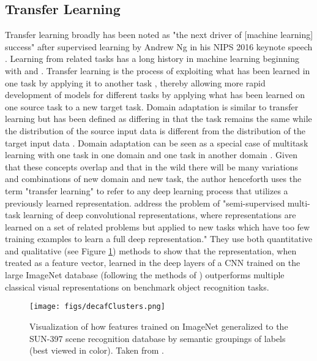 \documentclass[10pt,twocolumn,letterpaper]{article}
\begin{document}
\subsection{Transfer Learning}
Transfer learning broadly has been noted as "the next driver of [machine learning] success" after supervised learning by Andrew Ng in his NIPS 2016 keynote speech \cite{ng2016nips}.
Learning from related tasks has a long history in machine learning beginning with \citet{thrun1996learning} and \citet{caruana1997multitask} \cite{donahue2014decaf}.
Transfer learning is the process of exploiting what has been learned in one task by applying it to another task \cite[chap. 15]{goodfellow2016deep}, thereby allowing
more rapid development of models for different tasks by applying what has been learned on one source task to a new target task. Domain adaptation is
similar to transfer learning but has been defined as differing in that the task remains the same while
the distribution of the source input data is different from the distribution of the target input data \cite[chap. 15]{goodfellow2016deep}. Domain adaptation can
be seen as a special case of multitask learning with one task in one domain and one task in another domain \cite{patel2015visual}. Given that these concepts overlap and that
in the wild there will be many variations and combinations of new domain and new task, the author henceforth uses the term "transfer learning" to refer to any deep learning
process that utilizes a previously learned representation.
\citet{donahue2014decaf} address the problem of "semi-supervised multi-task learning of deep convolutional representations,
where representations are learned on a set of related problems but applied to new tasks which have too few training examples to learn a full deep representation."
They use both quantitative and qualitative (see Figure \ref{fig:decafClusters}) methods to show that the representation, when treated as a feature vector, learned in the deep layers of a CNN
trained on the large ImageNet \cite{deng2009imagenet} database (following the methods of \citet{krizhevsky2012imagenet}) outperforms multiple classical visual representations
on benchmark object recognition tasks.
\begin{figure}[H]
  \centering
  \texttt{[image: figs/decafClusters.png]}
  \caption{Visualization of how features trained on
  ImageNet \cite{deng2009imagenet} generalized to the SUN-397 scene recognition database \cite{xiao2010sun} by semantic groupings of labels (best viewed in color). Taken from \citet{donahue2014decaf}.}
  \label{fig:decafClusters}
\end{figure}
\end{document}
